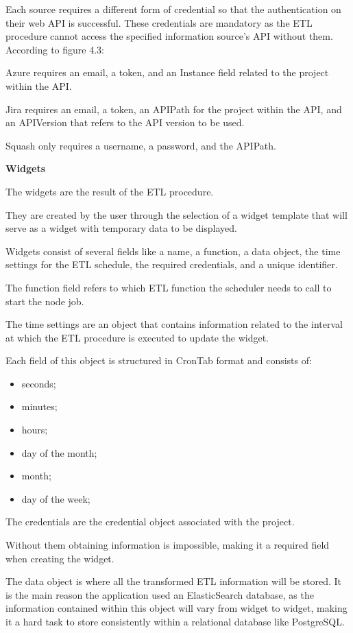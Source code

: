 \documentclass[a4paper,twoside,10pt]{report}
\begin{document}
Each source requires a different form of credential so that the authentication on their web API is successful. These credentials are mandatory as the ETL procedure cannot access the specified information source's API without them.
\newline
According to figure 4.3:
\newline

Azure requires an email, a token, and an Instance field related to the project within the API.

Jira requires an email, a token, an APIPath for the project within the API, and an APIVersion that refers to the API version to be used.

Squash only requires a username, a password, and the APIPath.

\newpage

\textbf{Widgets}

The widgets are the result of the ETL procedure.

They are created by the user through the selection of a widget template that will serve as a widget with temporary data to be displayed.

Widgets consist of several fields like a name, a function, a data object, the time settings for the ETL schedule, the required credentials, and a unique identifier.

The function field refers to which ETL function the scheduler needs to call to start the node job.

The time settings are an object that contains information related to the interval at which the ETL procedure is executed to update the widget. 

Each field of this object is structured in CronTab format and consists of:
\begin{itemize}
 \item seconds;
 \item minutes;
 \item hours;
 \item day of the month;
 \item month;
 \item day of the week;
\end{itemize}
The credentials are the credential object associated with the project.

Without them obtaining information is impossible, making it a required field when creating the widget.

The data object is where all the transformed ETL information will be stored. It is the main reason the application used an ElasticSearch database, as the information contained within this object will vary from widget to widget, making it a hard task to store consistently within a relational database like PostgreSQL.
\end{document}

